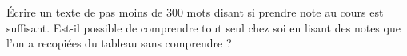
\begin{exercice}\label{exosmath-0430}

    Écrire un texte de pas moins de 300 mots disant si prendre note au cours est suffisant. Est-il possible de comprendre tout seul chez soi en lisant des notes que l'on a recopiées du tableau sans comprendre ?

\end{exercice}
